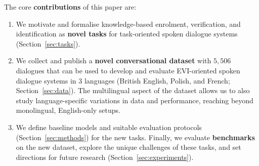 \documentclass[11pt]{article}
\begin{document}
The core \textbf{contributions} of this paper are:
\begin{enumerate}[topsep=1pt,itemsep=-1ex,partopsep=1ex,parsep=1ex]
   \item We motivate and formalise knowledge-based enrolment, verification, and identification as \textbf{novel tasks} for task-oriented spoken dialogue systems (Section~\ref{sec:tasks}).
   \item We collect and publish a \textbf{novel conversational dataset} with $5,506$ dialogues that can be used to develop and evaluate EVI-oriented spoken dialogue systems in $3$ languages (British English, Polish, and French; Section~\ref{sec:data}). The multilingual aspect of the dataset allows us to also study language-specific variations in data and performance, reaching beyond monolingual, English-only setups.
   \item {We define baseline models and suitable evaluation protocols (Section~\ref{sec:methods}) for the new tasks.
   Finally, we evaluate \textbf{benchmarks} on the new dataset,
   explore the unique challenges of these tasks,
   and set directions for future research (Section~\ref{sec:experiments})}.
\end{enumerate}
\end{document}
